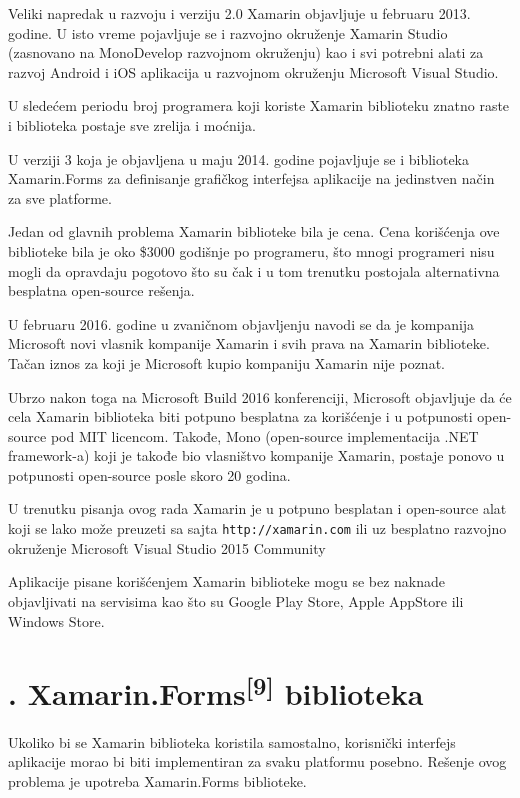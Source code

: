\documentclass[a4paper]{article}
\begin{document}
Veliki napredak u razvoju i verziju 2.0 Xamarin objavljuje u februaru
2013. godine. U isto vreme pojavljuje se i razvojno okruženje Xamarin
Studio (zasnovano na MonoDevelop razvojnom okruženju) kao i svi
potrebni alati za razvoj Android i iOS aplikacija u razvojnom okruženju
Microsoft Visual Studio. 

U sledećem periodu broj programera koji koriste Xamarin biblioteku
znatno raste i biblioteka postaje sve zrelija i moćnija.

U verziji 3 koja je objavljena u maju 2014. godine pojavljuje se i
biblioteka Xamarin.Forms za definisanje grafičkog interfejsa aplikacije
na jedinstven način za sve platforme.

Jedan od glavnih problema Xamarin biblioteke bila je cena. Cena
korišćenja ove biblioteke bila je oko \$3000 godišnje po programeru,
što mnogi programeri nisu mogli da opravdaju pogotovo što su čak i u
tom trenutku postojala alternativna besplatna open-source rešenja.

U februaru 2016. godine u zvaničnom objavljenju navodi se da je
kompanija Microsoft novi vlasnik kompanije Xamarin i svih prava na
Xamarin biblioteke. Tačan iznos za koji je Microsoft kupio kompaniju
Xamarin nije poznat.

Ubrzo nakon toga na Microsoft Build 2016 konferenciji, Microsoft
objavljuje da će cela Xamarin biblioteka biti potpuno besplatna za
korišćenje i u potpunosti open-source pod MIT licencom. Takođe, Mono
(open-source implementacija .NET framework-a) koji je takođe bio
vlasništvo kompanije Xamarin, postaje ponovo u potpunosti open-source
posle skoro 20 godina.

U trenutku pisanja ovog rada Xamarin je u potpuno besplatan i
open-source alat koji se lako može preuzeti sa sajta
\texttt{\textcolor[rgb]{0.0,0.4,0.8}{http://xamarin.com}} ili uz
besplatno razvojno okruženje Microsoft Visual Studio 2015 Community

Aplikacije pisane korišćenjem Xamarin biblioteke mogu se bez naknade
objavljivati na servisima kao što su Google Play Store, Apple AppStore
ili Windows Store.

\clearpage\section[6. Xamarin.Forms[9{]} biblioteka]{.
Xamarin.Forms\textsuperscript{[9]} biblioteka}
\hypertarget{RefHeadingToc10541394079323}{}Ukoliko bi se Xamarin
biblioteka koristila samostalno, korisnički interfejs aplikacije morao
bi biti implementiran za svaku platformu posebno. Rešenje ovog problema
je upotreba Xamarin.Forms biblioteke.
\end{document}
